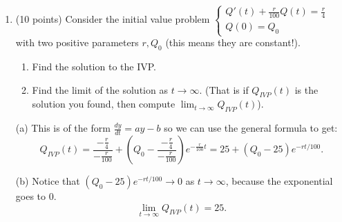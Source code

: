 \documentclass{article}
\begin{document}
\begin{enumerate}
\begin{enumerate}
			The equilibrim solutions are $y=0$ and $y=3$.
		\end{enumerate}
	\newpage
\item (10 points) Consider the initial value problem
	$\begin{cases}
		Q'(t)+\frac{r}{100}Q(t)=\frac{r}{4}\\
		Q(0)=Q_0
	\end{cases}$
	with two positive parameters $r,Q_0$ (this means they are constant!).
	\begin{enumerate}
		\item Find the solution to the IVP.
		\item Find the limit of the solution as $t\to\infty$. (That is
			if $Q_{IVP}(t)$ is the solution you found, then compute
			$\lim_{t\to\infty}Q_{IVP}(t)$).
	\end{enumerate}

	(a)
	This is of the form $\frac{dy}{dt}=ay-b$ so we can use the general formula to get:
	\[
		Q_{IVP}(t)=\frac{-\frac{r}{4}}{-\frac{r}{100}}+
		\left(Q_0-\frac{-\frac{r}{4}}{-\frac{r}{100}}\right)e^{-\frac{r}{100}t}
		=25+(Q_0-25)e^{-rt/100}.
	\]

	(b)
	Notice that $(Q_0-25)e^{-rt/100}\to0$ as $t\to\infty$, because the
	exponential goes to 0.
	\[
		\lim_{t\to\infty}Q_{IVP}(t)=25.
	\]
\end{enumerate}
\end{document}
